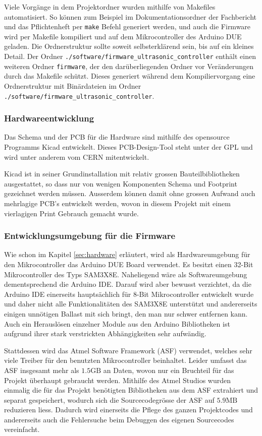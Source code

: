 Viele Vorgänge in dem Projektordner wurden mithilfe von Makefiles automatisiert. So können zum Beispiel im Dokumentationsordner der Fachbericht und das Pflichtenheft per \texttt{make} Befehl generiert werden, und auch die Firmware wird per Makefile kompiliert und auf dem Mikrocontroller des Arduino DUE geladen. Die Ordnerstruktur sollte soweit selbsterklärend sein, bis auf ein kleines Detail. Der Ordner \texttt{./software/firmware\_ultrasonic\_controller} enthält einen weiteren Ordner \texttt{firmware}, der den darüberliegenden Ordner vor Veränderungen durch das Makefile schützt. Dieses generiert während dem Kompiliervorgang eine Ordnerstruktur mit Binärdateien im Ordner \texttt{./software/firmware\_ultrasonic\_controller}.

\subsubsection{Hardwareentwicklung}\label{sec:hardwareentwicklung}
Das Schema und der PCB für die Hardware sind mithilfe des opensource Programms Kicad entwickelt. Dieses PCB-Design-Tool steht unter der GPL und wird unter anderem vom CERN mitentwickelt.

Kicad ist in seiner Grundinstallation mit relativ grossen Bauteilbibliotheken ausgestattet, so dass nur von wenigen Komponenten Schema und Footprint gezeichnet werden müssen. Ausserdem können damit ohne grossen Aufwand auch mehrlagige PCB's entwickelt werden, wovon in diesem Projekt mit einem vierlagigen Print Gebrauch gemacht wurde.

\subsubsection{Entwicklungsumgebung für die Firmware}\label{sec:entwicklungsumgebung_fuer_die_firmware}
Wie schon im Kapitel \ref{sec:hardware} erläutert, wird als Hardwareumgebung für den Mikrocontroller das Arduino DUE Board verwendet. Es besitzt einen 32-Bit Mikrocontroller des Typs SAM3X8E. Naheliegend wäre als Softwareumgebung dementsprechend die Arduino IDE. Darauf wird aber bewusst verzichtet, da die Arduino IDE einerseits hauptsächlich für 8-Bit Mikrocontroller entwickelt wurde und daher nicht alle Funktionalitäten des SAM3X8E unterstützt und andererseits einigen unnötigen Ballast mit sich bringt, den man nur schwer entfernen kann. Auch ein Herauslösen einzelner Module aus den Arduino Bibliotheken ist aufgrund ihrer stark verstrickten Abhängigkeiten sehr aufwändig.

Stattdessen wird das Atmel Software Framework (ASF) verwendet, welches sehr viele Treiber für den benutzten Mikrocontroller beinhaltet. Leider umfasst das ASF insgesamt mehr als $1.5 \mathrm{GB}$ an Daten, wovon nur ein Bruchteil für das Projekt überhaupt gebraucht werden. Mithilfe des Atmel Studios wurden einmalig die für das Projekt benötigten Bibliotheken aus dem ASF extrahiert und separat gespeichert, wodurch sich die Sourcecodegrösse der ASF auf $5.9 \mathrm{MB}$ reduzieren liess. Dadurch wird einerseits die Pflege des ganzen Projektcodes und andererseits auch die Fehlersuche beim Debuggen des eigenen Sourcecodes vereinfacht.

